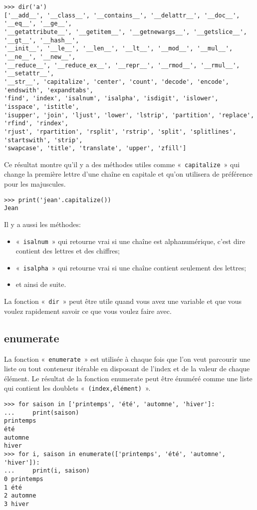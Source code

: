 \begin{footnotesize}
\begin{Verbatim}[frame=single,rulecolor=\color{gray}]
>>> dir('a')
['__add__', '__class__', '__contains__', '__delattr__', '__doc__', '__eq__', '__ge__', 
'__getattribute__', '__getitem__', '__getnewargs__', '__getslice__', '__gt__', '__hash__',
'__init__', '__le__', '__len__', '__lt__', '__mod__', '__mul__', '__ne__', '__new__', 
'__reduce__', '__reduce_ex__', '__repr__', '__rmod__', '__rmul__', '__setattr__', 
'__str__', 'capitalize', 'center', 'count', 'decode', 'encode', 'endswith', 'expandtabs', 
'find', 'index', 'isalnum', 'isalpha', 'isdigit', 'islower', 'isspace', 'istitle', 
'isupper', 'join', 'ljust', 'lower', 'lstrip', 'partition', 'replace', 'rfind', 'rindex', 
'rjust', 'rpartition', 'rsplit', 'rstrip', 'split', 'splitlines', 'startswith', 'strip', 
'swapcase', 'title', 'translate', 'upper', 'zfill']
\end{Verbatim}
\end{footnotesize}

Ce résultat montre qu'il y a des méthodes utiles comme « \texttt{capitalize} » qui change la première lettre d'une chaîne en capitale et qu'on utilisera de préférence pour les majuscules.

\begin{Verbatim}[frame=single,rulecolor=\color{gray}]
>>> print('jean'.capitalize())
Jean
\end{Verbatim}

Il y a aussi les méthodes:
\begin{itemize} 
\item « \texttt{isalnum} » qui retourne vrai si une chaîne est alphanumérique, c'est dire contient des lettres et des chiffres;
\item « \texttt{isalpha} » qui retourne vrai si une chaîne contient seulement des lettres;
\item et ainsi de suite.
\end{itemize}  

La fonction « \texttt{dir} » peut être utile quand vous avez une variable et que vous voulez rapidement savoir ce que vous voulez faire avec.


\subsection*{enumerate}
La fonction « \texttt{enumerate} » est utilisée à chaque fois que l'on veut parcourir une liste ou tout conteneur itérable en disposant de l'index et de la valeur de chaque élément. Le résultat de la fonction enumerate peut être énuméré comme une liste qui contient les doublets « \texttt{(index,élément)} ». 
\begin{small}
\begin{Verbatim}[frame=single,rulecolor=\color{gray}]
>>> for saison in ['printemps', 'été', 'automne', 'hiver']:
...     print(saison)
printemps
été
automne
hiver
>>> for i, saison in enumerate(['printemps', 'été', 'automne', 'hiver']):
...     print(i, saison)
0 printemps
1 été
2 automne
3 hiver
\end{Verbatim}
\end{small}

